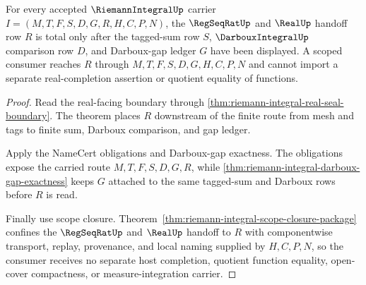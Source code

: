 \begin{theorem}
\label{thm:riemann-integral-regseqrat-handoff-totality}
For every accepted $\RiemannIntegralUp$ carrier $I=(M,T,F,S,D,G,R,H,C,P,N)$, the $\RegSeqRatUp$ and $\RealUp$ handoff row $R$ is total only after the tagged-sum row $S$, $\DarbouxIntegralUp$ comparison row $D$, and Darboux-gap ledger $G$ have been displayed. A scoped consumer reaches $R$ through $M,T,F,S,D,G,H,C,P,N$ and cannot import a separate real-completion assertion or quotient equality of functions.
\end{theorem}
\begin{proof}
Read the real-facing boundary through \autoref{thm:riemann-integral-real-seal-boundary}. The theorem places $R$ downstream of the finite route from mesh and tags to finite sum, Darboux comparison, and gap ledger.

Apply the NameCert obligations and Darboux-gap exactness. The obligations expose the carried route $M,T,F,S,D,G,R$, while \autoref{thm:riemann-integral-darboux-gap-exactness} keeps $G$ attached to the same tagged-sum and Darboux rows before $R$ is read.

Finally use scope closure. Theorem~\ref{thm:riemann-integral-scope-closure-package} confines the $\RegSeqRatUp$ and $\RealUp$ handoff to $R$ with componentwise transport, replay, provenance, and local naming supplied by $H,C,P,N$, so the consumer receives no separate host completion, quotient function equality, open-cover compactness, or measure-integration carrier.
\end{proof}

